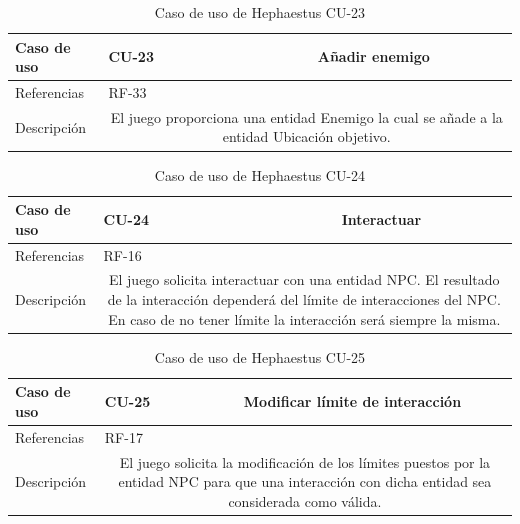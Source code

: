 \begin{table}[H]
	\centering
	\small
	\begin{tabularx}{\linewidth}{|l|cc|}
		\hline
		{\cellcolor[HTML]{C0C0C0} Caso de uso} & \multicolumn{1}{l|}{CU-23} & Añadir enemigo \\ \hline
		{\cellcolor[HTML]{C0C0C0} Referencias} & \multicolumn{2}{l|}{RF-33} \\ \hline
		{\cellcolor[HTML]{C0C0C0} Descripción} & \multicolumn{2}{X|}{El juego proporciona una entidad Enemigo la cual se añade a la entidad Ubicación objetivo.} \\ \hline
	\end{tabularx}
	
	\vspace{0.5cm}
	\caption{Caso de uso de Hephaestus CU-23}
	\label{tab:hephaestus-cu-23}
\end{table}

\begin{table}[H]
	\centering
	\small
	\begin{tabularx}{\linewidth}{|l|cc|}
		\hline
		{\cellcolor[HTML]{C0C0C0} Caso de uso} & \multicolumn{1}{l|}{CU-24} & Interactuar \\ \hline
		{\cellcolor[HTML]{C0C0C0} Referencias} & \multicolumn{2}{l|}{RF-16} \\ \hline
		{\cellcolor[HTML]{C0C0C0} Descripción} & \multicolumn{2}{X|}{El juego solicita interactuar con una entidad NPC. El resultado de la interacción dependerá del límite de interacciones del NPC. En caso de no tener límite la interacción será siempre la misma.} \\ \hline
	\end{tabularx}
	
	\vspace{0.5cm}
	\caption{Caso de uso de Hephaestus CU-24}
	\label{tab:hephaestus-cu-24}
\end{table}

\begin{table}[H]
	\centering
	\small
	\begin{tabularx}{\linewidth}{|l|cc|}
		\hline
		{\cellcolor[HTML]{C0C0C0} Caso de uso} & \multicolumn{1}{l|}{CU-25} & Modificar límite de interacción \\ \hline
		{\cellcolor[HTML]{C0C0C0} Referencias} & \multicolumn{2}{l|}{RF-17} \\ \hline
		{\cellcolor[HTML]{C0C0C0} Descripción} & \multicolumn{2}{X|}{El juego solicita la modificación de los límites puestos por la entidad NPC para que una interacción con dicha entidad sea considerada como válida.} \\ \hline
	\end{tabularx}
	
	\vspace{0.5cm}
	\caption{Caso de uso de Hephaestus CU-25}
	\label{tab:hephaestus-cu-25}
\end{table}

